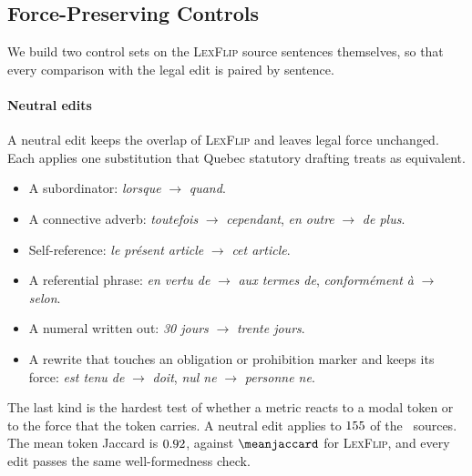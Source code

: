 \documentclass{BVP_JCLLT}
\newcommand{\rev}[1]{#1}
\newcommand{\rev}[1]{{\color{revcol}#1}}
\begin{document}
\begin{table}
\centering
\caption{\rev{\textsc{LexFlip} examples from seven tier-1 rules, with the edited
span in bold. Each edited sentence shares almost all of its tokens with the
original and changes the legal force of the provision.}}\label{tab:examples}
\small
\rev{}
\end{table}

\rev{\subsection{Force-Preserving Controls}\label{sec:specmethod}
We build two control sets on the \textsc{LexFlip} source sentences themselves, so
that every comparison with the legal edit is paired by sentence.

\paragraph{Neutral edits}
A neutral edit keeps the overlap of \textsc{LexFlip} and leaves legal force
unchanged. Each applies one substitution that Quebec statutory drafting treats as
equivalent.

\begin{itemize}\itemsep1pt
\item A subordinator: \emph{lorsque} $\rightarrow$ \emph{quand}.
\item A connective adverb: \emph{toutefois} $\rightarrow$ \emph{cependant},
  \emph{en outre} $\rightarrow$ \emph{de plus}.
\item Self-reference: \emph{le pr\'esent article} $\rightarrow$ \emph{cet
  article}.
\item A referential phrase: \emph{en vertu de} $\rightarrow$ \emph{aux termes
  de}, \emph{conform\'ement \`a} $\rightarrow$ \emph{selon}.
\item A numeral written out: \emph{30 jours} $\rightarrow$ \emph{trente jours}.
\item A rewrite that touches an obligation or prohibition marker and keeps its
  force: \emph{est tenu de} $\rightarrow$ \emph{doit}, \emph{nul ne}
  $\rightarrow$ \emph{personne ne}.
\end{itemize}

The last kind is the hardest test of whether a metric reacts to a modal token or
to the force that the token carries. A neutral edit applies to $155$ of the
\numedits\ sources. The mean token Jaccard is $0.92$, against
$\meanjaccard$ for \textsc{LexFlip}, and every edit passes the same
well-formedness check.

}
\end{document}
